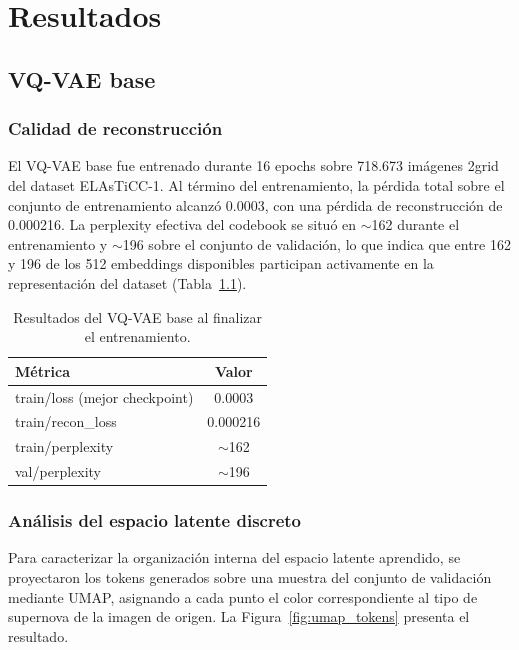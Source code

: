 \chapter{Resultados}

\section{VQ-VAE base}

\subsection{Calidad de reconstrucción}

El VQ-VAE base fue entrenado durante 16 epochs sobre 718.673 imágenes 2grid 
del dataset ELAsTiCC-1. Al término del entrenamiento, la pérdida total sobre 
el conjunto de entrenamiento alcanzó 0.0003, con una pérdida de 
reconstrucción de 0.000216. La perplexity efectiva del codebook se situó en 
$\sim$162 durante el entrenamiento y $\sim$196 sobre el conjunto de 
validación, lo que indica que entre 162 y 196 de los 512 embeddings 
disponibles participan activamente en la representación del dataset 
(Tabla~\ref{tab:vqvae_base_results}).

\begin{table}[H]
\centering
\begin{tabular}{|l|c|}
\hline
\textbf{Métrica} & \textbf{Valor} \\
\hline
train/loss (mejor checkpoint) & 0.0003 \\
train/recon\_loss              & 0.000216 \\
train/perplexity               & $\sim$162 \\
val/perplexity                 & $\sim$196 \\
\hline
\end{tabular}
\caption{Resultados del VQ-VAE base al finalizar el entrenamiento.}
\label{tab:vqvae_base_results}
\end{table}


\subsection{Análisis del espacio latente discreto}
\label{sec:umap_base}

Para caracterizar la organización interna del espacio latente aprendido, se 
proyectaron los tokens generados sobre una muestra del conjunto de validación 
mediante UMAP, asignando a cada punto el color correspondiente al tipo de 
supernova de la imagen de origen. La Figura~\ref{fig:umap_tokens} presenta el 
resultado.

